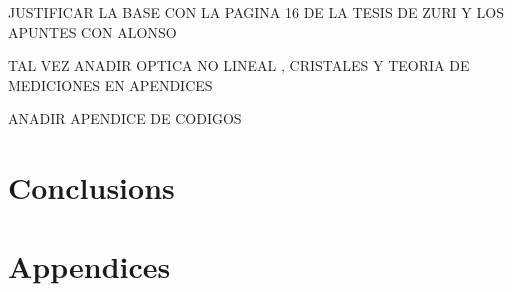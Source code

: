 \documentclass[12pt]{book}
\begin{document}
 JUSTIFICAR LA BASE CON LA PAGINA 16 DE LA TESIS DE ZURI Y LOS APUNTES CON ALONSO 

TAL VEZ ANADIR OPTICA NO LINEAL , CRISTALES Y TEORIA DE MEDICIONES EN APENDICES

ANADIR APENDICE DE CODIGOS





\pagebreak 
\section{Conclusions}
\pagebreak


\section{Appendices}
\pagebreak





\vspace{1 cm}
\end{document}
